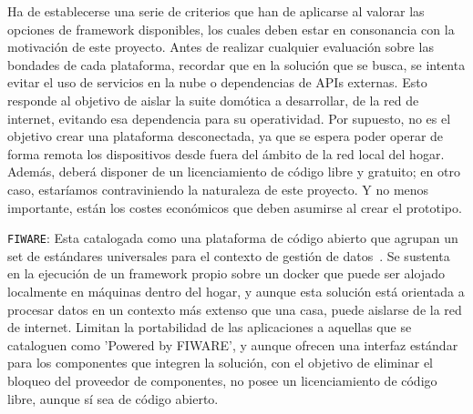 Ha de establecerse una serie de criterios que han de aplicarse al valorar las opciones de \gls{framework} disponibles, los cuales deben estar en consonancia con la motivación de este proyecto. Antes de realizar cualquier evaluación sobre las bondades de cada plataforma, recordar que en la solución que se busca, se intenta evitar el uso de servicios en la nube o dependencias de APIs externas. Esto responde al objetivo de aislar la suite domótica a desarrollar, de la red de internet, evitando esa dependencia para su operatividad. Por supuesto, no es el objetivo crear una plataforma desconectada, ya que se espera poder operar de forma remota los dispositivos desde fuera del ámbito de la red local del hogar. Además, deberá disponer de un licenciamiento de código libre y gratuito; en otro caso, estaríamos contraviniendo la naturaleza de este proyecto. Y no menos importante, están los costes económicos que deben asumirse al crear el prototipo.

\vspace{1cm}

\verb|FIWARE|: Esta catalogada como una plataforma de código abierto que agrupan un set de estándares universales para el contexto de gestión de datos~\cite{whatisfiware}. Se sustenta en la ejecución de un \gls{framework} propio sobre un \gls{docker} que puede ser alojado localmente en máquinas dentro del hogar, y aunque esta solución está orientada a procesar datos en un contexto más extenso que una casa, puede aislarse de la red de internet. Limitan la portabilidad de las aplicaciones a aquellas que se cataloguen como 'Powered by FIWARE', y aunque ofrecen una interfaz estándar para los componentes que integren la solución, con el objetivo de eliminar el bloqueo del proveedor de componentes, no posee un licenciamiento de código libre, aunque sí sea de código abierto.

\vspace{1cm}

